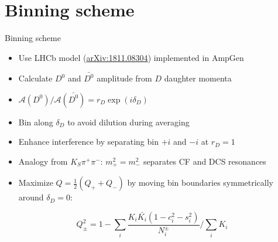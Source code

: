 \documentclass{beamer}
\begin{document}
\section{Binning scheme}
\begin{frame}{Binning scheme}
  \begin{itemize}
    \setlength\itemsep{1.2em}
    \item{Use LHCb model (\href{https://arxiv.org/abs/1811.08304}{arXiv:1811.08304}) implemented in AmpGen}
    \item{Calculate $D^0$ and $\bar{D^0}$ amplitude from $D$ daughter momenta}
    \item{$\mathcal{A}(D^0)/\mathcal{A}(\bar{D^0}) = r_D\exp(i\delta_D)$}
    \item{Bin along $\delta_D$ to avoid dilution during averaging}
    \item{Enhance interference by separating bin $+i$ and $-i$ at $r_D = 1$}
    \item{Analogy from $K_S\pi^+\pi^-$: $m^2_+ = m^2_-$ separates CF and DCS resonances}
    \item{Maximize $Q = \frac{1}{2}(Q_+ + Q_-)$ by moving bin boundaries symmetrically around $\delta_D = 0$:}
  \end{itemize}
  \begin{equation*}
    Q_\pm^2 = 1 - \sum_i\frac{K_i\bar{K_i}(1 - c_i^2 - s_i^2)}{N^\pm_i}\Big/\sum_iK_i
  \end{equation*}
\end{frame}
\end{document}
